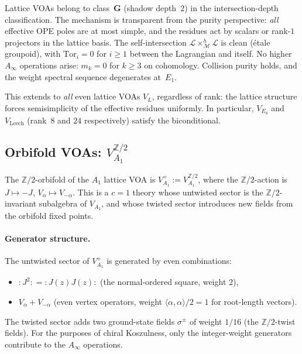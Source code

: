\documentclass[11pt]{article}
\newcommand{\Z}{\mathbb{Z}}
\begin{document}
\begin{remark}
Lattice VOAs belong to class~$\mathbf{G}$ (shadow depth~$2$)
in the intersection-depth classification.  The mechanism is
transparent from the purity perspective: \emph{all} effective
OPE poles are at most simple, and the residues act by scalars
or rank-$1$ projectors in the lattice basis.  The
self-intersection $\mathscr{L} \times_{\mathscr{M}}^h
\mathscr{L}$ is clean (\'etale groupoid), with
$\mathrm{Tor}_i = 0$ for $i \geq 1$ between the Lagrangian
and itself.  No higher $A_\infty$ operations arise:
$m_k = 0$ for $k \geq 3$ on cohomology.  Collision purity
holds, and the weight spectral sequence degenerates
at~$E_1$.

This extends to \emph{all} even lattice VOAs $V_L$,
regardless of rank: the lattice structure forces semisimplicity
of the effective residues uniformly.  In particular,
$V_{E_8}$ and $V_{\mathrm{Leech}}$ (rank~$8$ and $24$
respectively) satisfy the biconditional.
\end{remark}

\subsection{Orbifold VOAs: $V_{A_1}^{\Z/2}$}
\label{subsec:orbifold-purity}

The $\Z/2$-orbifold of the $A_1$ lattice VOA is
$V_{A_1}^{+} := V_{A_1}^{\Z/2}$, where the
$\Z/2$-action is $J \mapsto -J$,
$V_\alpha \mapsto V_{-\alpha}$.  This is a $c = 1$ theory
whose untwisted sector is the $\Z/2$-invariant
subalgebra of $V_{A_1}$, and whose twisted sector
introduces new fields from the orbifold fixed points.

\paragraph{Generator structure.}
The untwisted sector of $V_{A_1}^{+}$ is generated by
even combinations:
\begin{itemize}[nosep]
\item $:J^2: = :J(z)J(z):$ (the normal-ordered square, weight $2$),
\item $V_\alpha + V_{-\alpha}$ (even vertex operators, weight
  $\langle\alpha,\alpha\rangle/2 = 1$ for root-length vectors).
\end{itemize}
The twisted sector adds two ground-state fields
$\sigma^{\pm}$ of weight $1/16$ (the
$\Z/2$-twist fields).  For the purposes of
chiral Koszulness, only the integer-weight generators
contribute to the $A_\infty$ operations.
\end{document}
